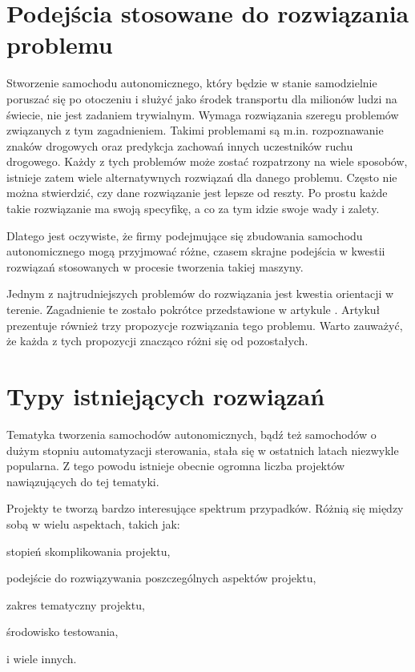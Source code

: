 \section{Podejścia stosowane do rozwiązania problemu}
Stworzenie samochodu autonomicznego, który będzie w stanie samodzielnie poruszać się po otoczeniu i służyć jako środek transportu dla milionów ludzi na świecie, nie jest zadaniem trywialnym. Wymaga rozwiązania szeregu problemów związanych z tym zagadnieniem. Takimi problemami są m.in. rozpoznawanie znaków drogowych oraz predykcja zachowań innych uczestników ruchu drogowego. Każdy z tych problemów może zostać rozpatrzony na wiele sposobów, istnieje zatem wiele alternatywnych rozwiązań dla danego problemu. Często nie można stwierdzić, czy dane rozwiązanie jest lepsze od reszty. Po prostu każde takie rozwiązanie ma swoją specyfikę, a co za tym idzie swoje wady i zalety.

Dlatego jest oczywiste, że firmy podejmujące się zbudowania samochodu autonomicznego mogą przyjmować różne, czasem skrajne podejścia w kwestii rozwiązań stosowanych w procesie tworzenia takiej maszyny.

Jednym z najtrudniejszych problemów do rozwiązania jest kwestia orientacji w terenie. Zagadnienie te zostało pokrótce przedstawione w artykule \cite{threeApproachesToOrientation}.
Artykuł prezentuje również trzy propozycje rozwiązania tego problemu. Warto zauważyć, że każda z tych propozycji znacząco różni się od pozostałych.

\section{Typy istniejących rozwiązań}
Tematyka tworzenia samochodów autonomicznych, bądź też samochodów o dużym stopniu automatyzacji sterowania, stała się w ostatnich latach niezwykle popularna. Z tego powodu istnieje obecnie ogromna liczba projektów nawiązujących do tej tematyki.

Projekty te tworzą bardzo interesujące spektrum przypadków. Różnią się między sobą w wielu aspektach, takich jak:
\begin{itemize*}
\item stopień skomplikowania projektu,
\item podejście do rozwiązywania poszczególnych aspektów projektu,
\item zakres tematyczny projektu,
\item środowisko testowania,
\item i wiele innych.
\end{itemize*}

